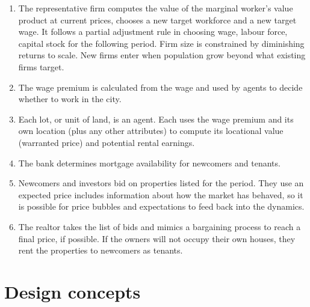 \begin{enumerate}
\item The representative firm computes the value of the marginal worker's value product at current prices, chooses a new target workforce and a new target wage. It follows a partial adjustment rule in choosing wage, labour force, capital stock for the following period. Firm size is constrained by diminishing returns to scale. New firms enter when population grow beyond what existing firms target. 

\item The wage premium is calculated from the wage and used by agents to decide whether to work in the city.

\item Each lot, or unit of land, is an agent. Each uses the wage premium and its own location (plus any other attributes) to compute its locational value (warranted price) and potential rental earnings. 

\item The bank determines mortgage availability for newcomers and tenants. 

\item Newcomers and investors bid on properties listed for the period. They use an expected price includes information about how the market has behaved, so it is possible for price bubbles and expectations to feed back into the dynamics. 

\item The realtor takes the list of bids and mimics a bargaining process to reach a final price, if possible. If the owners will not occupy their own houses, they rent the properties to newcomers as tenants. %
\end{enumerate}




\section{Design concepts}



